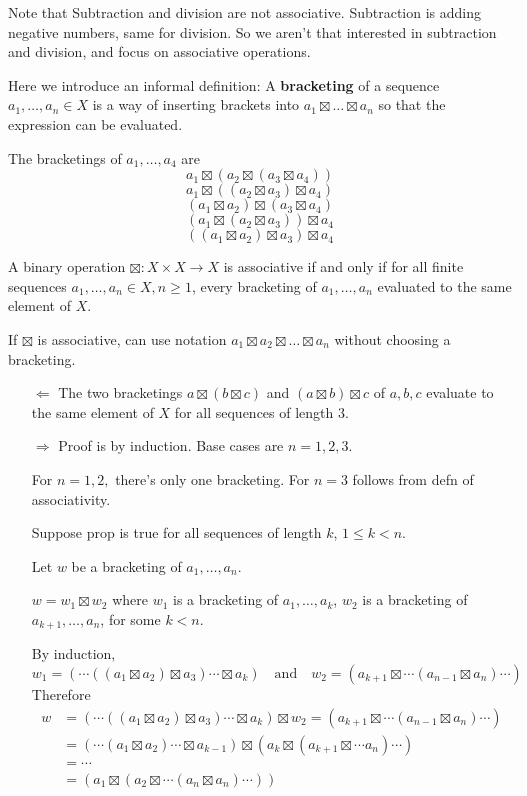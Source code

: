 Note that Subtraction and division are not associative. Subtraction is adding negative numbers, same for division. So we aren't that interested in subtraction and division, and focus on associative operations.

Here we introduce an informal definition: A \textbf{bracketing} of a sequence $a_1,\ldots,a_n\in X$ is a way of inserting brackets into $a_1\boxtimes \ldots \boxtimes a_n$ so that the expression can be evaluated.

\begin{ex}
The bracketings of $a_1,\ldots, a_4$ are 
$$a_1 \boxtimes (a_2 \boxtimes (a_3 \boxtimes a_4))$$
$$a_1 \boxtimes ((a_2 \boxtimes a_3) \boxtimes a_4)$$
$$(a_1 \boxtimes a_2) \boxtimes (a_3 \boxtimes a_4)$$
$$(a_1 \boxtimes (a_2 \boxtimes a_3)) \boxtimes a_4$$
$$((a_1 \boxtimes a_2) \boxtimes a_3) \boxtimes a_4$$
\end{ex}

\begin{prop}
A binary operation $\boxtimes: X\times X\to X$ is associative if and only if for all finite sequences $a_1,\ldots,a_n\in X, n\ge 1$, every bracketing of $a_1,\ldots,a_n$ evaluated to the same element of $X$.
\end{prop}
\begin{note}
	If $\boxtimes$ is associative, can use notation $a_1\boxtimes a_2 \boxtimes \ldots \boxtimes a_n$ without choosing a bracketing.
\end{note}
\begin{pf}
\begin{itemize}
\item[$\Leftarrow$] The two bracketings $a\boxtimes (b\boxtimes c)$ and $(a\boxtimes b)\boxtimes c$ of $a,b,c$ evaluate to the same element of $X$ for all sequences of length 3.
\item[$\Rightarrow$] Proof is by induction. Base cases are $n=1,2,3$.

For $n=1,2,$ there's only one bracketing. For $n=3$ follows from defn of associativity.

Suppose prop is true for all sequences of length $k$, $1\le k < n$.

Let $w$ be a bracketing of $a_1,\ldots,a_n$. 

$w=w_1\boxtimes w_2$ where $w_1$ is a bracketing of $a_1,\ldots,a_k$, $w_2$ is a bracketing of $a_{k+1},\ldots,a_n$, for some $k<n$.

By induction,
$$w_1=(\cdots ((a_1\boxtimes a_2)\boxtimes a_3)\cdots \boxtimes a_k) \quad \text{and} \quad w_2 = (a_{k+1}\boxtimes \cdots (a_{n-1}\boxtimes a_n)\cdots)$$
Therefore
$$
\begin{aligned}
w&=(\cdots ((a_1\boxtimes a_2)\boxtimes a_3)\cdots \boxtimes a_k)\boxtimes w_2 = (a_{k+1}\boxtimes \cdots (a_{n-1}\boxtimes a_n)\cdots)\\
&= (\cdots (a_1\boxtimes a_2)\cdots \boxtimes a_{k-1})\boxtimes (a_k \boxtimes (a_{k+1}\boxtimes \cdots a_n)\cdots)\\
&= \cdots \\
&= (a_1\boxtimes (a_2 \boxtimes \cdots (a_n\boxtimes a_n)\cdots))
\end{aligned}
$$
\end{itemize}
\end{pf}

